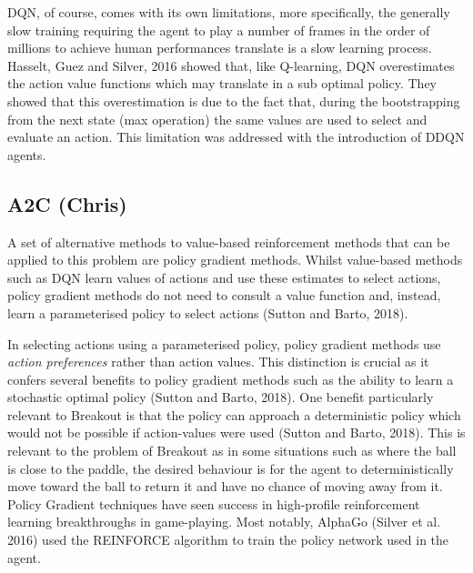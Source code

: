 \documentclass{article}
\begin{document}
DQN, of course, comes with its own limitations, more specifically, the generally slow training requiring the agent to play a number of frames in the order of millions to achieve human performances translate is a slow learning process. Hasselt, Guez and Silver, 2016  showed that, like Q-learning, DQN overestimates the action value functions which may translate in a sub optimal policy. They showed that this overestimation is due to the fact that, during the bootstrapping from the next state (max operation) the same values are used to select and evaluate an action. This limitation was addressed with the introduction of DDQN agents.


\subsection{A2C (Chris)}

A set of alternative methods to value-based reinforcement methods that can be applied to this problem are policy gradient methods. Whilst value-based methods such as DQN learn values of actions and use these estimates to select actions, policy gradient methods do not need to consult a value function and, instead, learn a parameterised policy to select actions (Sutton and Barto, 2018).

In selecting actions using a parameterised policy, policy gradient methods use \emph{action preferences} rather than action values. This distinction is crucial as it confers several benefits to policy gradient methods such as the ability to learn a stochastic optimal policy (Sutton and Barto, 2018). One benefit particularly relevant to Breakout is that the policy can approach a deterministic policy which would not be possible if action-values were used (Sutton and Barto, 2018). This is relevant to the problem of Breakout as in some situations such as where the ball is close to the paddle, the desired behaviour is for the agent to deterministically move toward the ball to return it and have no chance of moving away from it. Policy Gradient techniques have seen success in high-profile reinforcement learning breakthroughs in game-playing. Most notably, AlphaGo (Silver et al. 2016) used the REINFORCE algorithm to train the policy network used in the agent.
\end{document}
